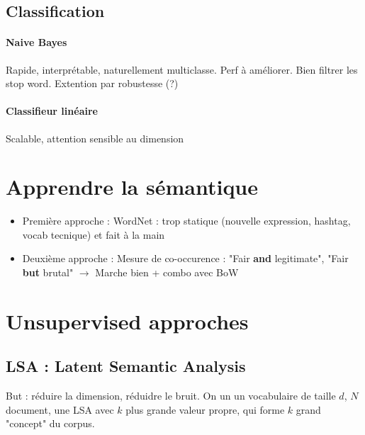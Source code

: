 \documentclass{article}
\theoremstyle{plain}%
\theoremstyle{definition}
\theoremstyle{remark}
\begin{document}
\subsection{Classification}
\paragraph*{Naive Bayes}
Rapide, interprétable, naturellement multiclasse. Perf à améliorer. Bien filtrer les stop word. Extention par robustesse (?)

\paragraph*{Classifieur linéaire}
Scalable, attention sensible au dimension

\section{Apprendre la sémantique}
\begin{itemize}
    \item Première approche : WordNet : trop statique (nouvelle expression, hashtag, vocab tecnique) et fait à la main 
    \item Deuxième approche : Mesure de co-occurence : "Fair \textbf{and} legitimate", "Fair \textbf{but} brutal" $\rightarrow$ Marche bien + combo avec BoW
\end{itemize}

\section{Unsupervised approches}
\subsection{LSA : Latent Semantic Analysis}
But : réduire la dimension, réduidre le bruit.
On un un vocabulaire de taille $ d $, $ N $ document, une LSA avec $ k $ plus grande valeur propre, qui forme $ k $ grand "concept" du corpus.
\end{document}
